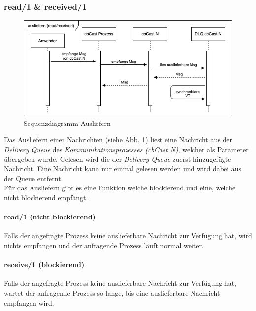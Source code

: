 \newpage

\subsubsection{read/1 \& received/1}

\begin{figure}[htbp]
\begin{center}
\includegraphics[scale=0.5]{Latex/Bilder/Sequenz_ausliefern.png}
\caption{\label{fig:sequence_cbCast_read_receive} Sequenzdiagramm Ausliefern}
\end{center}
\end{figure}

Das Ausliefern einer Nachrichten (siehe Abb. \ref{fig:sequence_cbCast_read_receive}) liest eine Nachricht aus der \textit{Delivery Queue} des \textit{Kommunikationsprozesses (cbCast N)}, welcher als Parameter übergeben wurde. Gelesen wird die der \textit{Delivery Queue} zuerst hinzugefügte Nachricht. Eine Nachricht kann nur einmal gelesen werden und wird dabei aus der Queue entfernt.\\
Für das Ausliefern gibt es eine Funktion welche blockierend und eine, welche nicht blockierend empfängt.

\paragraph{read/1 (nicht blockierend)}

Falls der angefragte Prozess keine auslieferbare Nachricht zur Verfügung hat, wird nichts empfangen und der anfragende Prozess läuft normal weiter.

\paragraph{receive/1 (blockierend)}

Falls der angefragte Prozess keine auslieferbare Nachricht zur Verfügung hat, wartet der anfragende Prozess so lange, bis eine auslieferbare Nachricht empfangen wird.\\

